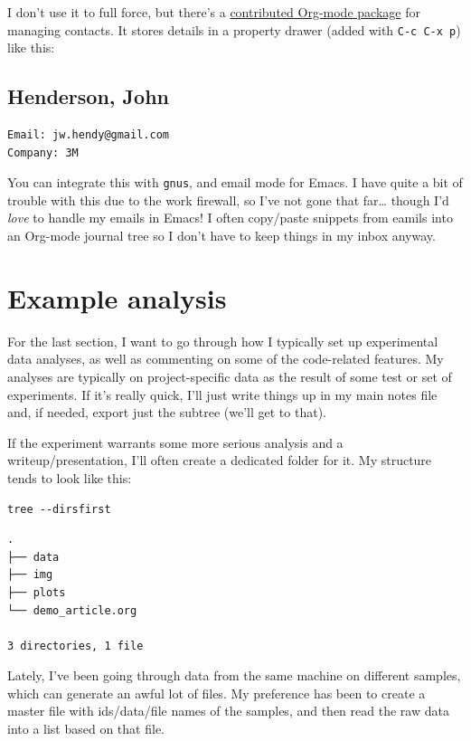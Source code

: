 \documentclass[11pt]{article}
\begin{document}
I don't use it to full force, but there's a \href{https://julien.danjou.info/projects/emacs-packages#org-contacts}{contributed Org-mode package} for managing
contacts. It stores details in a property drawer (added with \texttt{C-c C-x p}) like this:

\subsection*{Henderson, John}
\label{sec:orgheadline10}
\begin{verbatim}
Email: jw.hendy@gmail.com
Company: 3M
\end{verbatim}

You can integrate this with \texttt{gnus}, and email mode for Emacs. I have quite a bit of
trouble with this due to the work firewall, so I've not gone that far\ldots{} though I'd \emph{love} to
handle my emails in Emacs! I often copy/paste snippets from eamils into an Org-mode
journal tree so I don't have to keep things in my inbox anyway.

\section*{Example analysis}
\label{sec:orgheadline14}

For the last section, I want to go through how I typically set up experimental data
analyses, as well as commenting on some of the code-related features. My analyses are
typically on project-specific data as the result of some test or set of experiments. If
it's really quick, I'll just write things up in my main notes file and, if needed, export
just the subtree (we'll get to that).

If the experiment warrants some more serious analysis and a writeup/presentation, I'll often create a
dedicated folder for it. My structure tends to look like this:

\begin{verbatim}
tree --dirsfirst
\end{verbatim}

\begin{verbatim}
.
├── data
├── img
├── plots
└── demo_article.org

3 directories, 1 file
\end{verbatim}

Lately, I've been going through data from the same machine on different samples, which
can generate an awful lot of files. My preference has been to create a master file with
ids/data/file names of the samples, and then read the raw data into a list based on that
file. 
\end{document}
